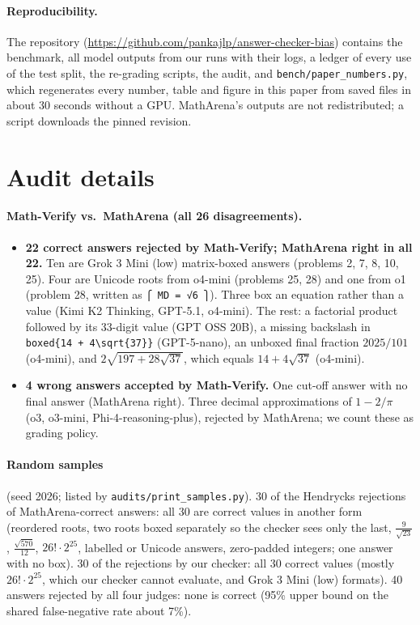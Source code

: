 \documentclass[11pt]{article}
\newcommand{\repo}{\url{https://github.com/pankajlp/answer-checker-bias}}
\begin{document}
\paragraph{Reproducibility.}
The repository (\repo) contains the benchmark, all model outputs from our runs with their logs, a ledger of every use of the test split, the re-grading scripts, the audit, and \texttt{bench/paper\_numbers.py}, which regenerates every number, table and figure in this paper from saved files in about 30 seconds without a GPU. MathArena's outputs are not redistributed; a script downloads the pinned revision.




\appendix
\section{Audit details}\label{app:audit}

\paragraph{Math-Verify vs.\ MathArena (all 26 disagreements).}
\begin{itemize}
  \item \textbf{22 correct answers rejected by Math-Verify; MathArena right in all 22.} Ten are Grok 3 Mini (low) matrix-boxed answers (problems 2, 7, 8, 10, 25). Four are Unicode roots from o4-mini (problems 25, 28) and one from o1 (problem 28, written as \texttt{⎧ MD = √6 ⎫}). Three box an equation rather than a value (Kimi K2 Thinking, GPT-5.1, o4-mini). The rest: a factorial product followed by its 33-digit value (GPT OSS 20B), a missing backslash in \texttt{boxed\{14 + 4\textbackslash sqrt\{37\}\}} (GPT-5-nano), an unboxed final fraction $2025/101$ (o4-mini), and $2\sqrt{197+28\sqrt{37}}$, which equals $14+4\sqrt{37}$ (o4-mini).
  \item \textbf{4 wrong answers accepted by Math-Verify.} One cut-off answer with no final answer (MathArena right). Three decimal approximations of $1-2/\pi$ (o3, o3-mini, Phi-4-reasoning-plus), rejected by MathArena; we count these as grading policy.
\end{itemize}

\paragraph{Random samples} (seed 2026; listed by \texttt{audits/print\_samples.py}).
30 of the \hendrycksFN{} Hendrycks rejections of MathArena-correct answers: all 30 are correct values in another form (reordered roots, two roots boxed separately so the checker sees only the last, $\frac{9}{\sqrt{23}}$, $\frac{\sqrt{570}}{12}$, $26!\cdot2^{25}$, labelled or Unicode answers, zero-padded integers; one answer with no box). 30 of the \oursFN{} rejections by our checker: all 30 correct values (mostly $26!\cdot2^{25}$, which our checker cannot evaluate, and Grok 3 Mini (low) formats). 40 answers rejected by all four judges: none is correct (95\% upper bound on the shared false-negative rate about 7\%).
\end{document}
